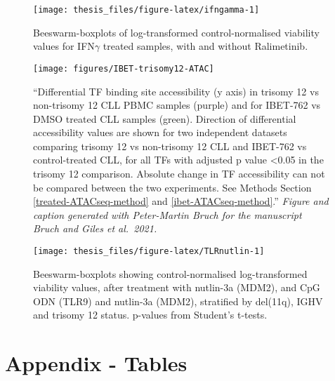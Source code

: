 \documentclass[11pt, a4paper, twosided]{book}
\begin{document}
\begin{figure}

{\centering \texttt{[image: thesis\_files/figure-latex/ifngamma-1]} 

}

\caption{Beeswarm-boxplots of log-transformed control-normalised viability values for IFN\(\gamma\) treated samples, with and without Ralimetinib.}\label{fig:ifngamma}
\end{figure}





\begin{figure}

{\centering \texttt{[image: figures/IBET-trisomy12-ATAC]} 

}

\caption{``Differential TF binding site accessibility (y axis) in trisomy 12 vs non-trisomy 12 CLL PBMC samples (purple) and for IBET-762 vs DMSO treated CLL samples (green). Direction of
differential accessibility values are shown for two independent datasets comparing trisomy 12
vs non-trisomy 12 CLL and IBET-762 vs control-treated CLL, for all TFs with adjusted p value
\textless0.05 in the trisomy 12 comparison. Absolute change in TF accessibility can not be compared
between the two experiments. See Methods Section \ref{treated-ATACseq-method} and \ref{ibet-ATACseq-method}.'' \emph{Figure and caption generated with Peter-Martin Bruch for the manuscript Bruch and Giles et al.~2021.}}\label{fig:ibetatac}
\end{figure}

\begin{figure}

{\centering \texttt{[image: thesis\_files/figure-latex/TLRnutlin-1]} 

}

\caption{Beeswarm-boxplots showing control-normalised log-transformed viability values, after treatment with nutlin-3a (MDM2), and CpG ODN (TLR9) and nutlin-3a (MDM2), stratified by del(11q), IGHV and trisomy 12 status. p-values from Student's t-tests.}\label{fig:TLRnutlin}
\end{figure}
\hypertarget{appendix---tables}{%
\chapter*{Appendix - Tables}\label{appendix---tables}}
\end{document}
